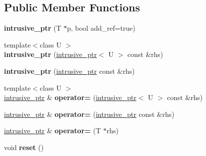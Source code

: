 \subsection*{Public Member Functions}
\begin{DoxyCompactItemize}
\item 
\hypertarget{classintrusive__ptr_a1a462a7c6f3247828d8360ca04511237}{{\bfseries intrusive\-\_\-ptr} (T $\ast$p, bool add\-\_\-ref=true)}\label{classintrusive__ptr_a1a462a7c6f3247828d8360ca04511237}

\item 
\hypertarget{classintrusive__ptr_a60d33e3607b90c2d7f315d2d0be19735}{{\footnotesize template$<$class U $>$ }\\{\bfseries intrusive\-\_\-ptr} (\hyperlink{classintrusive__ptr}{intrusive\-\_\-ptr}$<$ U $>$ const \&rhs)}\label{classintrusive__ptr_a60d33e3607b90c2d7f315d2d0be19735}

\item 
\hypertarget{classintrusive__ptr_a1a05008b03d6cfb92dfa60515cd848d8}{{\bfseries intrusive\-\_\-ptr} (\hyperlink{classintrusive__ptr}{intrusive\-\_\-ptr} const \&rhs)}\label{classintrusive__ptr_a1a05008b03d6cfb92dfa60515cd848d8}

\item 
\hypertarget{classintrusive__ptr_a3f784a56085dd6e9f711e57a803dd1dc}{{\footnotesize template$<$class U $>$ }\\\hyperlink{classintrusive__ptr}{intrusive\-\_\-ptr} \& {\bfseries operator=} (\hyperlink{classintrusive__ptr}{intrusive\-\_\-ptr}$<$ U $>$ const \&rhs)}\label{classintrusive__ptr_a3f784a56085dd6e9f711e57a803dd1dc}

\item 
\hypertarget{classintrusive__ptr_ae1f058e2b20ea4ef7c3c4c30c8c37694}{\hyperlink{classintrusive__ptr}{intrusive\-\_\-ptr} \& {\bfseries operator=} (\hyperlink{classintrusive__ptr}{intrusive\-\_\-ptr} const \&rhs)}\label{classintrusive__ptr_ae1f058e2b20ea4ef7c3c4c30c8c37694}

\item 
\hypertarget{classintrusive__ptr_acbf9dbecf8e789db853832d84e2c7e19}{\hyperlink{classintrusive__ptr}{intrusive\-\_\-ptr} \& {\bfseries operator=} (T $\ast$rhs)}\label{classintrusive__ptr_acbf9dbecf8e789db853832d84e2c7e19}

\item 
\hypertarget{classintrusive__ptr_ae360b0fffd335b683b350c154922c6db}{void {\bfseries reset} ()}\label{classintrusive__ptr_ae360b0fffd335b683b350c154922c6db}


\end{DoxyCompactItemize}
